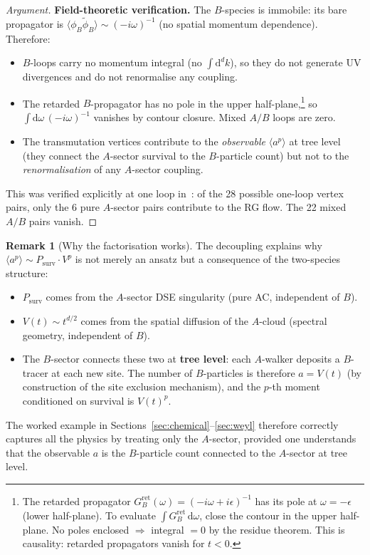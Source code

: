 \documentclass[11pt,a4paper]{article}
\theoremstyle{definition}
\newtheorem*{remark}{Remark}
\newcommand{\dd}{\mathrm{d}}
\newcommand{\phit}{\tilde{\phi}}
\newcommand{\Psurv}{P_{\mathrm{surv}}}
\begin{document}
\begin{proof}[Argument]
\medskip\noindent
\textbf{Field-theoretic verification.}
The $B$-species is immobile: its bare propagator is
$\langle \phi_B \phit_B \rangle \sim (-i\omega)^{-1}$ (no spatial
momentum dependence). Therefore:
\begin{itemize}
\item $B$-loops carry no momentum integral (no $\int \dd^d k$), so they
      do not generate UV divergences and do not renormalise any coupling.
\item The retarded $B$-propagator has no pole in the upper
      half-plane,\footnote{The retarded propagator
      $G^{\mathrm{ret}}_B(\omega) = (-i\omega + i\epsilon)^{-1}$ has its
      pole at $\omega = -\epsilon$ (lower half-plane). To evaluate
      $\int G^{\mathrm{ret}}_B\,\dd\omega$, close the contour in the
      upper half-plane. No poles enclosed $\Rightarrow$ integral $= 0$
      by the residue theorem. This is causality: retarded propagators
      vanish for $t < 0$.}
      so $\int \dd\omega\, (-i\omega)^{-1}$ vanishes by contour closure.
      Mixed $A/B$ loops are zero.
\item The transmutation vertices contribute to the \emph{observable}
      $\langle a^p \rangle$ at tree level (they connect the $A$-sector
      survival to the $B$-particle count) but not to the
      \emph{renormalisation} of any $A$-sector coupling.
\end{itemize}
This was verified explicitly at one loop
in~\cite{amarteifio2019,nekovar2016}: of the 28 possible one-loop
vertex pairs, only the 6 pure $A$-sector pairs contribute to the
RG flow. The 22 mixed $A/B$ pairs vanish.
\end{proof}

\begin{remark}[Why the factorisation works]
The decoupling explains why $\langle a^p \rangle \sim \Psurv \cdot V^p$
is not merely an ansatz but a consequence of the two-species structure:
\begin{itemize}
\item $\Psurv$ comes from the $A$-sector DSE singularity (pure AC,
      independent of $B$).
\item $V(t) \sim t^{d/2}$ comes from the spatial diffusion of the
      $A$-cloud (spectral geometry, independent of $B$).
\item The $B$-sector connects these two at \textbf{tree level}: each
      $A$-walker deposits a $B$-tracer at each new site. The number of
      $B$-particles is therefore $a = V(t)$ (by construction of the site
      exclusion mechanism), and the $p$-th moment conditioned on
      survival is $V(t)^p$.
\end{itemize}
The worked example in Sections~\ref{sec:chemical}--\ref{sec:weyl}
therefore correctly captures all the physics by treating only the
$A$-sector, provided one understands that the observable $a$ is the
$B$-particle count connected to the $A$-sector at tree level.
\end{remark}
\end{document}
